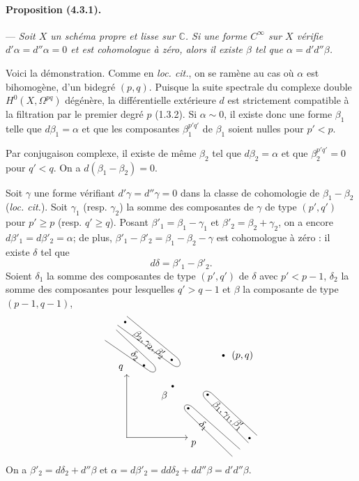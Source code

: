 \documentclass[10pt]{article}
\newcommand{\C}{\mathbb C}
\begin{document}
\paragraph{Proposition (4.3.1).} --- {\itshape Soit $X$ un schéma propre et lisse sur $\C$. Si une forme $C^\infty$ sur $X$ vérifie $d'\alpha=d''\alpha=0$ et est cohomologue à zéro, alors il existe $\beta$ tel que $\alpha=d'd''\beta$.}

Voici la démonstration. Comme en \textit{loc. cit.}, on se ramène au cas où $\alpha$ est bihomogène, d'un bidegré $(p,q)$. Puisque la suite spectrale du complexe double $H^0(X,\Omega^{pq})$ dégénère, la différentielle extérieure $d$ est strictement compatible à la filtration par le premier degré $p$ (1.3.2). Si $\alpha\sim0$, il existe donc une forme $\beta_1$ telle que $d\beta_1=\alpha$ et que les composantes $\beta_1^{p'q'}$ de $\beta_1$ soient nulles pour $p'<p$.

Par conjugaison complexe, il existe de même $\beta_2$ tel que $d\beta_2=\alpha$ et que $\beta_2^{p'q'}=0$ pour $q'<q$. On a $d(\beta_1-\beta_2)=0$.

Soit $\gamma$ une forme vérifiant $d'\gamma=d''\gamma=0$ dans la classe de cohomologie de $\beta_1-\beta_2$ (\textit{loc. cit.}). Soit $\gamma_1$ (resp. $\gamma_2$) la somme des composantes de $\gamma$ de type $(p',q')$ pour $p'\ge p$ (resp. $q'\ge q$). Posant $\beta'_1=\beta_1-\gamma_1$ et $\beta'_2=\beta_2+\gamma_2$, on a encore $d\beta'_1=d\beta'_2=\alpha$; de plus, $\beta'_1-\beta'_2=\beta_1-\beta_2-\gamma$ est cohomologue à zéro : il existe $\delta$ tel que
\[
d\delta=\beta'_1-\beta'_2.
\]
Soient $\delta_1$ la somme des composantes de type $(p',q')$ de $\delta$ avec $p'<p-1$, $\delta_2$ la somme des composantes pour lesquelles $q'>q-1$ et $\beta$ la composante de type $(p-1,q-1)$,
\[
\begin{tikzpicture}[x=.68cm,y=.68cm,baseline=(current bounding box.center),line cap=round,line join=round]
\draw[->] (0,0)--(3.25,0) node[below right] {$p$};
\draw[->] (0,0)--(0,3.35) node[above left] {$q$};
\fill (2.45,2.72) circle (1.3pt) node[below left=2pt] {$\beta$};
\fill (5.15,4.35) circle (1.3pt) node[right=5pt] {$(p,q)$};
\draw (-1.15,5.15)--(1.18,3.55)
  .. controls (1.48,3.34) and (1.68,3.55) .. (1.42,3.87)--(-.55,5.70);
\fill (.92,3.82) circle (1.2pt);
\node[rotate=-39] at (.45,4.35) {$\delta_2$};
\draw (-.48,5.95)--(2.42,3.86)
  .. controls (2.76,3.61) and (3.02,3.86) .. (2.70,4.22)--(.02,6.42);
\fill (-.08,6.12) circle (1.2pt);
\fill (2.40,4.12) circle (1.2pt);
\node[rotate=-39] at (1.20,4.94) {$\beta_2,\gamma_2,\beta'_2$};
\draw (5.62,-1.00)--(3.20,1.34)
  .. controls (2.91,1.62) and (3.14,1.88) .. (3.48,1.63)--(6.03,-.62);
\fill (3.28,1.55) circle (1.2pt);
\node[rotate=-43] at (4.08,.62) {$\delta_1$};
\draw (6.48,-.28)--(4.20,2.04)
  .. controls (3.90,2.35) and (4.17,2.62) .. (4.53,2.34)--(6.93,.12);
\fill (4.31,2.27) circle (1.2pt);
\fill (6.54,-.03) circle (1.2pt);
\node[rotate=-42] at (5.38,1.17) {$\beta_1,\gamma_1,\beta'_1$};
\end{tikzpicture}
\]
On a $\beta'_2=d\delta_2+d''\beta$ et $\alpha=d\beta'_2=dd\delta_2+dd''\beta=d'd''\beta$.
\end{document}
